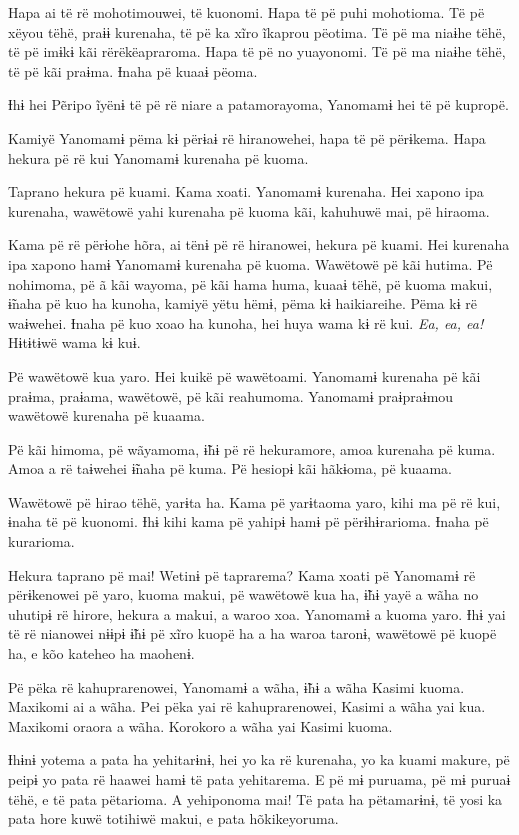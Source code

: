 Hapa ai të rë mohotimouwei, të kuonomi. Hapa të pë puhi mohotioma. Të pë
xëyou tëhë, praɨɨ kurenaha, të pë ka xĩro ĩkaprou pëotima. Të pë ma
niaɨhe tëhë, të pë imɨkɨ kãi rërëkëapraroma. Hapa të pë no yuayonomi. Të
pë ma niaɨhe tëhë, të pë kãi praɨma. Ɨnaha pë kuaaɨ pëoma. 

Ɨhɨ hei Pẽripo ĩyënɨ të pë rë niare a patamorayoma, Yanomamɨ hei të pë
kupropë.  

Kamiyë Yanomamɨ pëma kɨ përɨaɨ rë hiranowehei, hapa të pë përɨkema. Hapa
hekura pë rë kui Yanomamɨ kurenaha pë kuoma. 

Taprano hekura pë kuami. Kama xoati. Yanomamɨ kurenaha. Hei xapono ipa
kurenaha, wawëtowë yahi kurenaha pë kuoma kãi, kahuhuwë mai, pë
hiraoma. 

Kama pë rë përɨohe hõra, ai tënɨ pë rë hiranowei, hekura pë kuami. Hei
kurenaha ipa xapono hamɨ Yanomamɨ kurenaha pë kuoma. Wawëtowë pë kãi
hutima. Pë nohimoma, pë ã kãi wayoma, pë kãi hama huma, kuaaɨ tëhë, pë
kuoma makui, ɨ̃naha pë kuo ha kunoha, kamiyë yëtu hëmɨ, pëma kɨ
haikiareihe. Pëma kɨ rë waɨwehei. Ɨnaha pë kuo xoao ha kunoha, hei huya
wama kɨ rë kui. \textit{Ea, ea, ea!} Hɨtɨtɨwë wama kɨ kuɨ. 

Pë wawëtowë kua yaro. Hei kuikë pë wawëtoami. Yanomamɨ kurenaha pë kãi
 praɨma, praɨama, wawëtowë, pë kãi reahumoma. Yanomamɨ praɨpraɨmou
 wawëtowë kurenaha pë kuaama. 

Pë kãi himoma, pë wãyamoma, ɨ̃hɨ pë rë hekuramore, amoa kurenaha pë kuma.
Amoa a rë taɨwehei ɨ̃naha pë kuma. Pë hesiopɨ kãi hãkɨoma, pë kuaama. 

Wawëtowë pë hirao tëhë, yarɨta ha. Kama pë yarɨtaoma yaro, kihi ma pë rë
kui, ɨnaha të pë kuonomi. Ɨhɨ kihi kama pë yahipɨ hamɨ pë përɨhɨrarioma.
Ɨnaha pë kurarioma. 

Hekura taprano pë mai! Wetinɨ pë taprarema? Kama xoati pë Yanomamɨ rë
përɨkenowei pë yaro, kuoma makui, pë wawëtowë kua ha, ɨ̃hɨ yayë a wãha no
uhutipɨ rë hirore, hekura a makui, a waroo xoa. Yanomamɨ a kuoma yaro.
Ɨhɨ yai të rë nianowei nɨɨpɨ ɨ̃hɨ pë xĩro kuopë ha a ha waroa taronɨ,
wawëtowë pë kuopë ha, e kõo kateheo ha maohenɨ. 

Pë pëka rë kahuprarenowei, Yanomamɨ a wãha, ɨ̃hɨ a wãha Kasimi kuoma.
Maxikomi ai a wãha. Pei pëka yai rë kahuprarenowei, Kasimi a wãha yai
kua. Maxikomi oraora a wãha. Korokoro a wãha yai Kasimi kuoma. 

Ɨhɨnɨ yotema a pata ha yehitarɨnɨ, hei yo ka rë kurenaha, yo ka kuami
makure, pë peipɨ yo pata rë haawei hamɨ të pata yehitarema. E pë mɨ
puruama, pë mɨ puruaɨ tëhë, e të pata pëtarioma. A yehiponoma mai! Të
pata ha pëtamarɨnɨ, të yosi ka pata hore kuwë totihiwë makui, e pata
hõkikeyoruma. 

